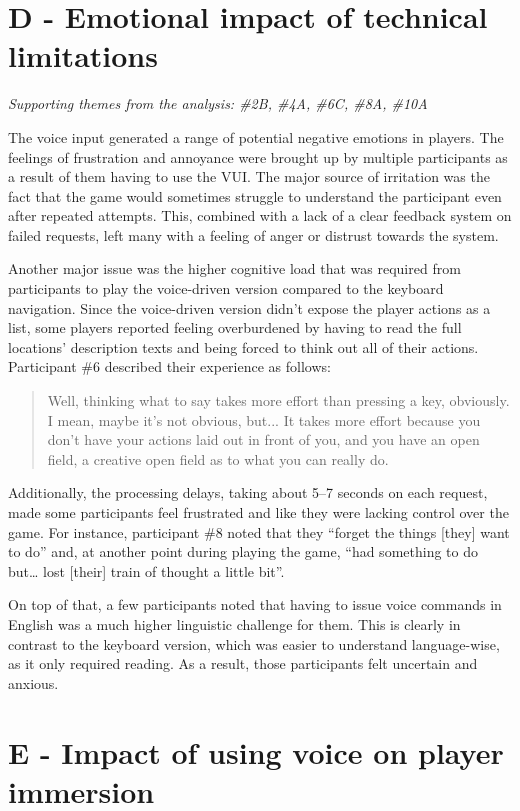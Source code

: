 \section{D - Emotional impact of technical limitations}

\textit{Supporting themes from the analysis: \#2B, \#4A, \#6C, \#8A, \#10A}


The voice input generated a range of potential negative emotions in players. The feelings of frustration and annoyance were brought up by multiple participants as a result of them having to use the VUI. The major source of irritation was the fact that the game would sometimes struggle to understand the participant even after repeated attempts. This, combined with a lack of a clear feedback system on failed requests, left many with a feeling of anger or distrust towards the system.

Another major issue was the higher cognitive load that was required from participants to play the voice-driven version compared to the keyboard navigation. Since the voice-driven version didn't expose the player actions as a list, some players reported feeling overburdened by having to read the full locations' description texts and being forced to think out all of their actions. 
Participant \#6 described their experience as follows: 
\begin{quote}
    Well, thinking what to say takes more effort than pressing a key, obviously.
    I mean, maybe it's not obvious, but...
    It takes more effort because you don't have your actions laid out in front of you, and you have an open field, a creative open field as to what you can really do.
\end{quote}

Additionally, the processing delays, taking about 5--7 seconds on each request, made some participants feel frustrated and like they were lacking control over the game. For instance, participant \#8 noted that they “forget the things [they] want to do” and, at another point during playing the game, “had something to do but… lost [their] train of thought a little bit”.

On top of that, a few participants noted that having to issue voice commands in English was a much higher linguistic challenge for them. 
This is clearly in contrast to the keyboard version, which was easier to understand language-wise, as it only required reading.
As a result, those participants felt uncertain and anxious.

\section{E - Impact of using voice on player immersion}

